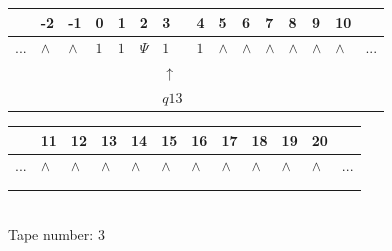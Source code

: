 \documentclass[11pt]{article}
\begin{document}
\begin{table}[H]
\centering
\begin{tabular}{lllllllllllllll}
 & -2 & -1 & 0 & 1 & 2 & 3 & 4 & 5 & 6 & 7 & 8 & 9 & 10 & \\
\hline
$...$ & \multicolumn{1}{|l|}{$\wedge$} & \multicolumn{1}{|l|}{$\wedge$} & \multicolumn{1}{|l|}{$1$} & \multicolumn{1}{|l|}{$1$} & \multicolumn{1}{|l|}{$\Psi$} & \multicolumn{1}{|l|}{$1$} & \multicolumn{1}{|l|}{$1$} & \multicolumn{1}{|l|}{$\wedge$} & \multicolumn{1}{|l|}{$\wedge$} & \multicolumn{1}{|l|}{$\wedge$} & \multicolumn{1}{|l|}{$\wedge$} & \multicolumn{1}{|l|}{$\wedge$} & \multicolumn{1}{|l|}{$\wedge$} & $...$\\
\hline
&  &  &  &  &  & $\uparrow$ &  &  &  &  &  &  &  &  \\
&  &  &  &  &  & $ q13 $ &  &  &  &  &  &  &  &  \\
\end{tabular}
\begin{tabular}{llllllllllll}
 & 11 & 12 & 13 & 14 & 15 & 16 & 17 & 18 & 19 & 20 & \\
\hline
$...$ & \multicolumn{1}{|l|}{$\wedge$} & \multicolumn{1}{|l|}{$\wedge$} & \multicolumn{1}{|l|}{$\wedge$} & \multicolumn{1}{|l|}{$\wedge$} & \multicolumn{1}{|l|}{$\wedge$} & \multicolumn{1}{|l|}{$\wedge$} & \multicolumn{1}{|l|}{$\wedge$} & \multicolumn{1}{|l|}{$\wedge$} & \multicolumn{1}{|l|}{$\wedge$} & \multicolumn{1}{|l|}{$\wedge$} & $...$\\
\hline
&  &  &  &  &  &  &  &  &  &  &  \\
&  &  &  &  &  &  &  &  &  &  &  \\
\end{tabular}
\\
Tape number: 3
\noindent\makebox[\linewidth]{\hdashrule{\textwidth}{1pt}{1pt}}\end{table}
\clearpage
\end{document}
